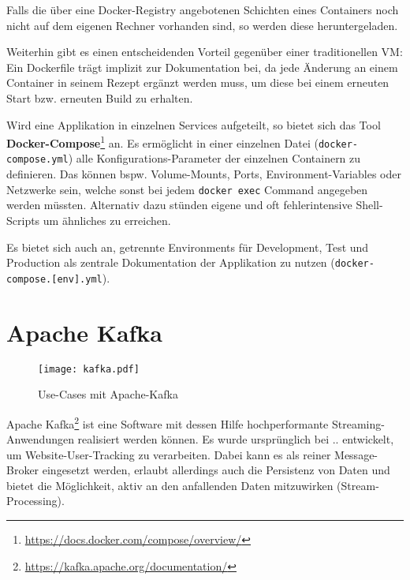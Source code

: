Falls die über eine Docker-Registry angebotenen Schichten eines Containers noch nicht auf dem eigenen Rechner vorhanden sind, so werden diese heruntergeladen.
\par
Weiterhin gibt es einen entscheidenden Vorteil gegenüber einer traditionellen \ac{VM}: Ein Dockerfile trägt implizit zur Dokumentation bei, da jede Änderung an einem Container in seinem Rezept ergänzt werden muss, um diese bei einem erneuten Start \ac{bzw.} erneuten Build zu erhalten.
\par
Wird eine Applikation in einzelnen Services aufgeteilt, so bietet sich das Tool \textbf{Docker-Compose}\footnote{\url{https://docs.docker.com/compose/overview/}} an.
Es ermöglicht in einer einzelnen Datei (\texttt{docker-\break compose.yml}) alle Konfigurations-Parameter der einzelnen Containern zu definieren.
Das können \ac{bspw.} Volume-Mounts, Ports, Environment-Variables oder Netzwerke sein, welche sonst bei jedem \texttt{docker exec} Command angegeben werden müssten.
Alternativ dazu stünden eigene und oft fehlerintensive Shell-Scripts um ähnliches zu erreichen. 
\par
Es bietet sich auch an, getrennte Environments für Development, Test und Production als zentrale Dokumentation der Applikation zu nutzen (\texttt{docker-\break compose.[env].yml}).

\section{Apache Kafka}
\begin{figure}[h]
  \centering
  \texttt{[image: kafka.pdf]}
  \par
  \caption{Use-Cases mit Apache-Kafka}
  \label{fig:layers-docker}
\end{figure}
Apache Kafka\footnote{\url{https://kafka.apache.org/documentation/}} ist eine Software mit dessen Hilfe hochperformante Streaming-Anwendungen realisiert werden können.
Es wurde ursprünglich bei .. entwickelt, um Website-User-Tracking zu verarbeiten.
Dabei kann es als reiner Message-Broker eingesetzt werden, erlaubt allerdings auch die Persistenz von Daten und bietet die Möglichkeit, aktiv an den anfallenden Daten mitzuwirken (Stream-Processing).
